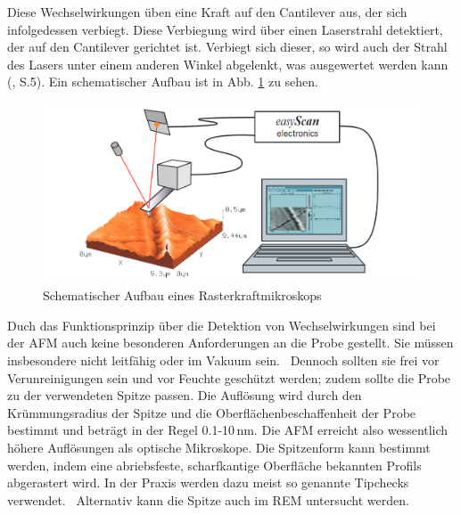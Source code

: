 Diese Wechselwirkungen üben eine Kraft auf den Cantilever aus, der sich infolgedessen verbiegt. Diese Verbiegung wird über einen 
Laserstrahl detektiert, der auf den Cantilever gerichtet ist. Verbiegt sich dieser, so wird auch der Strahl des Lasers unter einem anderen 
Winkel abgelenkt, was ausgewertet werden kann (\cite{Haugstad2012}, S.5). Ein schematischer Aufbau ist in Abb. \ref{bild:Aufbau} zu sehen.

\begin{figure}[h]
    \centering
    \includegraphics[scale = 0.45]{Bilder/AufbauAFM.png}
    \caption{Schematischer Aufbau eines Rasterkraftmikroskops \protect \footnotemark}
    \label{bild:Aufbau}
\end{figure}

Duch das Funktionsprinzip über die Detektion von Wechselwirkungen sind bei der AFM auch keine besonderen Anforderungen an die Probe 
gestellt. Sie müssen insbesondere nicht leitfähig oder im Vakuum sein. \footnotemark \, Dennoch sollten sie frei vor Verunreinigungen sein 
und vor Feuchte geschützt werden; zudem sollte die Probe zu der verwendeten Spitze passen. 
Die Auflösung wird durch den Krümmungsradius der Spitze und die 
Oberflächenbeschaffenheit der Probe bestimmt und beträgt in der Regel 0.1-10\,nm. Die AFM erreicht also wessentlich höhere Auflösungen als optische Mikroskope. 
Die Spitzenform kann bestimmt werden, indem eine abriebsfeste, scharfkantige Oberfläche bekannten Profils abgerastert wird. In der Praxis werden dazu meist so genannte 
Tipchecks verwendet. \footnotemark \, Alternativ kann die Spitze auch im REM untersucht werden.\\


